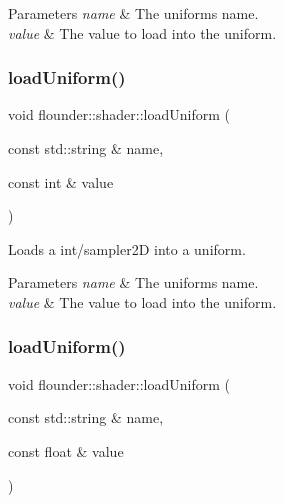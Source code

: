 \begin{DoxyParams}{Parameters}
{\em name} & The uniforms name. \\
\hline
{\em value} & The value to load into the uniform. \\
\hline
\end{DoxyParams}
\mbox{\label{classflounder_1_1shader_a597fdaefa4644b107e8ce2776ce69f76}} 
\subsubsection{\texorpdfstring{load\+Uniform()}{loadUniform()}\hspace{0.1cm}{\footnotesize\ttfamily [2/13]}}
{\footnotesize\ttfamily void flounder\+::shader\+::load\+Uniform (\begin{DoxyParamCaption}\item[{const std\+::string \&}]{name,  }\item[{const int \&}]{value }\end{DoxyParamCaption})}



Loads a int/sampler2D into a uniform. 


\begin{DoxyParams}{Parameters}
{\em name} & The uniforms name. \\
\hline
{\em value} & The value to load into the uniform. \\
\hline
\end{DoxyParams}
\mbox{\label{classflounder_1_1shader_acd349b44107fc3389856a124da305d62}} 
\subsubsection{\texorpdfstring{load\+Uniform()}{loadUniform()}\hspace{0.1cm}{\footnotesize\ttfamily [3/13]}}
{\footnotesize\ttfamily void flounder\+::shader\+::load\+Uniform (\begin{DoxyParamCaption}\item[{const std\+::string \&}]{name,  }\item[{const float \&}]{value }\end{DoxyParamCaption})}



